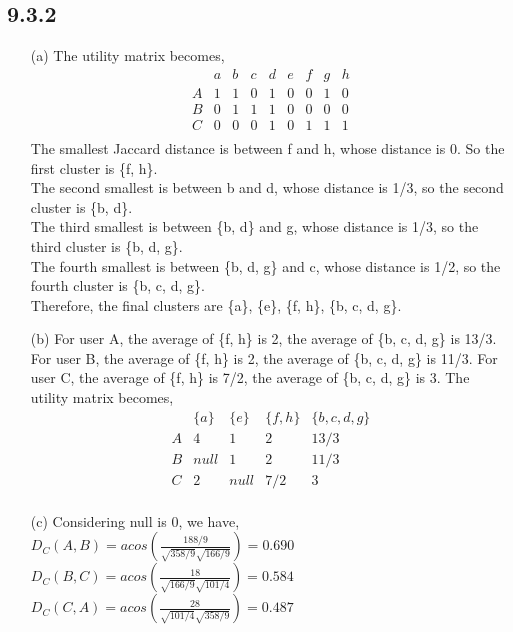 \documentclass{article}
\begin{document}
\subsection*{9.3.2}
\begin{enumerate}
    \item[(a)]
    The utility matrix becomes,\\
    \[
    \begin{array}{c|cccccccc}
    & a & b & c & d & e & f & g & h \\
    \hline
    A & 1 & 1 & 0 & 1 & 0 & 0 & 1 & 0 \\
    B & 0 & 1 & 1 & 1 & 0 & 0 & 0 & 0 \\
    C & 0 & 0 & 0 & 1 & 0 & 1 & 1 & 1 \\
    \end{array}
    \]
    The smallest Jaccard distance is between f and h, whose distance is 0. So the first cluster is \{f, h\}.\\
    The second smallest is between b and d, whose distance is 1/3, so the second cluster is \{b, d\}.\\
    The third smallest is between \{b, d\} and g, whose distance is 1/3, so the third cluster is \{b, d, g\}.\\
    The fourth smallest is between \{b, d, g\} and c, whose distance is 1/2, so the fourth cluster is \{b, c, d, g\}.\\
    Therefore, the final clusters are \{a\}, \{e\}, \{f, h\}, \{b, c, d, g\}.
    \item[(b)]
    For user A, the average of \{f, h\} is 2,
    the average of \{b, c, d, g\} is 13/3.
    For user B, the average of \{f, h\} is 2,
    the average of \{b, c, d, g\} is 11/3.
    For user C, the average of \{f, h\} is 7/2,
    the average of \{b, c, d, g\} is 3.
    The utility matrix becomes,\\
    \[
    \begin{array}{c|cccccccc}
    & \{a\} & \{e\} & \{f, h\} & \{b, c, d, g\}\\
    \hline
    A & 4 & 1 & 2 & 13/3 \\
    B & null & 1 & 2 & 11/3 \\
    C & 2 & null & 7/2 & 3 \\
    \end{array}
    \]
    
    \item[(c)]
    Considering null is 0, we have,\\
    \(D_C(A,B) = acos(\frac{188/9}{\sqrt{358/9}\sqrt{166/9}}) = 0.690\)\\
    \(D_C(B,C) = acos(\frac{18}{\sqrt{166/9}\sqrt{101/4}}) = 0.584\)\\
    \(D_C(C,A) = acos(\frac{28}{\sqrt{101/4}\sqrt{358/9}}) = 0.487\)
    

\end{enumerate}
\end{document}
